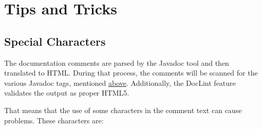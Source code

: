 \section{Tips and Tricks}
\subsection{Special Characters}\label{sec:DocCommentSpecialChars}
The documentation comments are parsed by the Javadoc tool and then translated to HTML. During that process, the comments will be scanned for the various Javadoc tags, mentioned \hyperref[sec:JavaDocTags]{above}. Additionally, the DocLint feature validates the output as proper HTML5.

That means that the use of some characters in the comment text can cause problems. These characters are:

\renewcommand{\cellalign}{tl}

